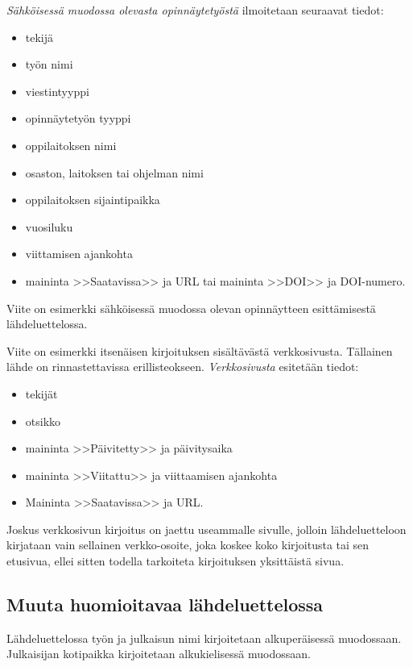 \documentclass[english,12pt,a4paper,pdftex,sci,utf8]{aaltothesis}
\begin{document}
\textit{S\"ahk\"oisess\"a muodossa olevasta opinn\"aytety\"ost\"a} ilmoitetaan
seuraavat tiedot:
 
\begin{itemize}
\item[--]tekij\"a
\item[--]ty\"on nimi
\item[--]viestintyyppi
\item[--]opinn\"aytety\"on tyyppi
\item[--]oppilaitoksen nimi
\item[--]osaston, laitoksen tai ohjelman nimi
\item[--]oppilaitoksen sijaintipaikka
\item[--]vuosiluku
\item[--]viittamisen ajankohta
\item[--]maininta >>Saatavissa>> ja URL tai 
        maininta >>DOI>> ja DOI-numero.
\end{itemize}

Viite \cite{Adida} on esimerkki s\"ahk\"oisess\"a muodossa olevan
opinn\"aytteen esitt\"amisest\"a l\"ahdeluettelossa.

Viite \cite{viittaaminen} on esimerkki itsen\"aisen kirjoituksen sis\"alt\"av\"ast\"a
verkkosivusta. T\"allainen l\"ahde on rinnastettavissa erillisteokseen.
\textit{Verkkosivusta} esitet\"a\"an tiedot:

\begin{itemize}
\item[--] tekij\"at
\item[--] otsikko
\item[--] maininta >>P\"aivitetty>> ja p\"aivitysaika 
\item[--] maininta >>Viitattu>> ja viittaamisen ajankohta
\item[--] Maininta >>Saatavissa>> ja URL.
\end{itemize}

Joskus verkkosivun kirjoitus on jaettu useammalle sivulle, jolloin
l\"ahdeluetteloon kirjataan vain sellainen verkko-osoite, joka koskee
koko kirjoitusta tai sen etusivua, ellei sitten 
todella tarkoiteta kirjoituksen yksitt\"aist\"a sivua. 

\subsection*{Muuta huomioitavaa l\"ahdeluettelossa}

L\"ahdeluettelossa ty\"on ja julkaisun nimi kirjoitetaan alkuper\"aisess\"a
muodossaan. Julkaisijan kotipaikka kirjoitetaan alkukielisess\"a
muodossaan.
\end{document}
